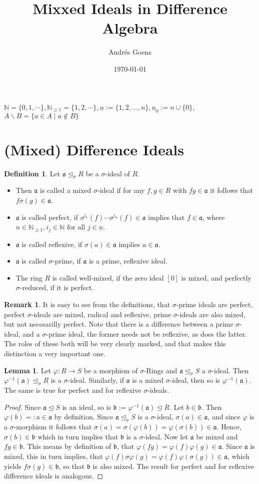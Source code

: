 \documentclass{article}
\title{Mixxed Ideals in Difference Algebra}
\author{Andr\'{e}s Goens}
\date{\today}
\def\NE{\mathbb{N}_{\geq1}}
\def\N{\mathbb{N}}
\def\a{\mathfrak{a}}
\def\b{\mathfrak{b}}
\def\s{\sigma}
\def\si{\unlhd_{\sigma}}
\def\n{\underline{n}}
\def\fa{\text{ for all }}
\newenvironment{bew}{\begin{proof}[Proof]}{\end{proof}}
\theoremstyle{definition}
\newtheorem{rem}[Satz]{Remark}
\newtheorem{defn}[Satz]{Definition}
\newtheorem{lem}[Satz]{Lemma}
\begin{document}
$\N = \{0,1,\cdots \}, \NE = \{1,2,\cdots \}, \n := \{1,2,\ldots, n\}, \n_0 := n \cup \{0\}$, $A \backslash B = \{ a \in A \mid a \notin B \}$
\section{(Mixed) Difference Ideals}
\begin{defn}
Let  $\a \si R$ be a $\s$-ideal of $R$. 
\begin{itemize}
\item Then $\a$ is called a mixed $\s$-ideal if for any $f,g \in R$ with $fg \in \a$ it follows that $f \sigma(g) \in \a$. 
\item $\a$ is called perfect, if $\sigma^{i_1}(f) \cdots \sigma^{i_n}(f) \in \a$ implies that $f \in \a$, where $n \in \NE, i_j \in \N \fa j \in \n$. 
\item $\a$ is called reflexive, if $\s(a) \in \a$ implies $a \in \a$. 
\item $\a$ is called $\s$-prime, if $\a$ is a prime, reflexive ideal.
\item The ring $R$ is called well-mixed, if the zero ideal $[0]$ is mixed, and perfectly $\s$-reduced, if it is perfect.
\end{itemize}
\end{defn}

\begin{rem}
It is easy to see from the definitions, that $\s$-prime ideals are perfect, perfect $\s$-ideals are mixed, radical and reflexive, prime $\s$-ideals are also mixed, but not necesarilly perfect. Note that there is a difference between a prime $\s$-ideal, and a $\s$-prime ideal, 
the former needs not be reflexive, as does the latter. The roles of these both will be very clearly marked, and that makes this distinction a very important one.
\end{rem}

\begin{lem}\label{bijmapping}
Let $\varphi: R \rightarrow S$ be a morphism of $\s$-Rings and $\a \si S$ a $\s$-ideal. Then $\varphi^{-1}(\a) \si R$ is a $\s$-ideal. Similarly, if $\a$ is a mixed $\s$-ideal, then so is $\varphi^{-1}(\a)$. The same is true for perfect and for reflexive $\s$-ideals.
\begin{bew}
Since $\a \unlhd S$ is an ideal, so is $\b := \varphi^{-1}(\a) \unlhd R$. Let $b \in \b$. Then $\varphi(b) =: a \in \a$ by definition. Since $\a \si S$ is a $\s$-ideal, $\s(a) \in \a$, and since $\varphi$ is a $\s$-morphism
 it follows that $\sigma(a) = \sigma(\varphi(b)) = \varphi (\s (b)) \in \a$. Hence, $\s(b) \in \b$ which in turn implies that $\b$ is a $\s$-ideal. Now let $\a$ be mixed and $fg \in \b$. This means by definition of $\b$, 
that $\varphi(fg) = \varphi(f) \varphi(g) \in \a$. Since $\a$ is mixed, this in turn implies, that $\varphi(f) \s \varphi(g) = \varphi(f) \varphi(\s(g)) \in \a$, which yields $f\s(g) \in \b$, so that $\b$ is also mixed. 
The result for perfect and for reflexive difference ideals is analogous.
\end{bew}
\end{lem}
\end{document}

